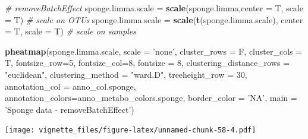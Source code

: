 \documentclass[]{book}
\newenvironment{Shaded}{\begin{snugshade}}{\end{snugshade}}
\newcommand{\KeywordTok}[1]{\textcolor[rgb]{0.13,0.29,0.53}{\textbf{#1}}}
\newcommand{\DataTypeTok}[1]{\textcolor[rgb]{0.13,0.29,0.53}{#1}}
\newcommand{\DecValTok}[1]{\textcolor[rgb]{0.00,0.00,0.81}{#1}}
\newcommand{\StringTok}[1]{\textcolor[rgb]{0.31,0.60,0.02}{#1}}
\newcommand{\CommentTok}[1]{\textcolor[rgb]{0.56,0.35,0.01}{\textit{#1}}}
\newcommand{\NormalTok}[1]{#1}
\begin{document}
\begin{Shaded}
\begin{Highlighting}[]
\CommentTok{# removeBatchEffect}
\NormalTok{sponge.limma.scale =}\StringTok{ }\KeywordTok{scale}\NormalTok{(sponge.limma,}\DataTypeTok{center =}\NormalTok{ T, }\DataTypeTok{scale =}\NormalTok{ T) }\CommentTok{# scale on OTUs}
\NormalTok{sponge.limma.scale =}\StringTok{ }\KeywordTok{scale}\NormalTok{(}\KeywordTok{t}\NormalTok{(sponge.limma.scale), }\DataTypeTok{center =}\NormalTok{ T, }\DataTypeTok{scale =}\NormalTok{ T) }\CommentTok{# scale on samples}

\KeywordTok{pheatmap}\NormalTok{(sponge.limma.scale, }
         \DataTypeTok{scale =} \StringTok{'none'}\NormalTok{, }
         \DataTypeTok{cluster_rows =}\NormalTok{ F, }
         \DataTypeTok{cluster_cols =}\NormalTok{ T, }
         \DataTypeTok{fontsize_row=}\DecValTok{5}\NormalTok{, }\DataTypeTok{fontsize_col=}\DecValTok{8}\NormalTok{,}
         \DataTypeTok{fontsize =} \DecValTok{8}\NormalTok{,}
         \DataTypeTok{clustering_distance_rows =} \StringTok{"euclidean"}\NormalTok{,}
         \DataTypeTok{clustering_method =} \StringTok{"ward.D"}\NormalTok{,}
         \DataTypeTok{treeheight_row =} \DecValTok{30}\NormalTok{,}
         \DataTypeTok{annotation_col =}\NormalTok{ anno_col.sponge,}
         \DataTypeTok{annotation_colors=}\NormalTok{anno_metabo_colors.sponge,}
         \DataTypeTok{border_color =} \StringTok{'NA'}\NormalTok{,}
         \DataTypeTok{main =} \StringTok{'Sponge data - removeBatchEffect'}\NormalTok{)}
\end{Highlighting}
\end{Shaded}

\texttt{[image: vignette\_files/figure-latex/unnamed-chunk-58-4.pdf]}
\end{document}

